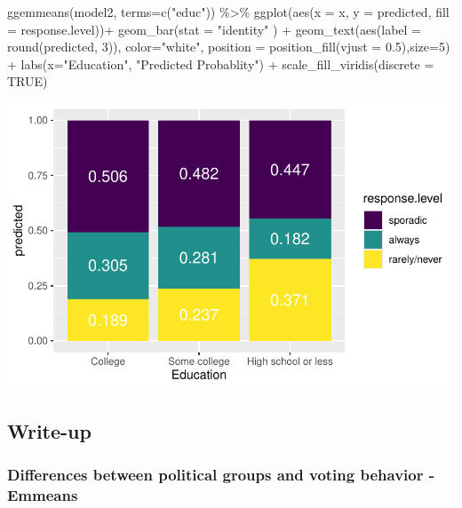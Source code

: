 \documentclass[
  letterpaper,
  DIV=11,
  numbers=noendperiod]{scrartcl}
\newenvironment{Shaded}{\begin{snugshade}}{\end{snugshade}}
\newcommand{\AttributeTok}[1]{\textcolor[rgb]{0.40,0.45,0.13}{#1}}
\newcommand{\ConstantTok}[1]{\textcolor[rgb]{0.56,0.35,0.01}{#1}}
\newcommand{\DecValTok}[1]{\textcolor[rgb]{0.68,0.00,0.00}{#1}}
\newcommand{\FloatTok}[1]{\textcolor[rgb]{0.68,0.00,0.00}{#1}}
\newcommand{\FunctionTok}[1]{\textcolor[rgb]{0.28,0.35,0.67}{#1}}
\newcommand{\NormalTok}[1]{\textcolor[rgb]{0.00,0.23,0.31}{#1}}
\newcommand{\SpecialCharTok}[1]{\textcolor[rgb]{0.37,0.37,0.37}{#1}}
\newcommand{\StringTok}[1]{\textcolor[rgb]{0.13,0.47,0.30}{#1}}
\begin{document}
\begin{Shaded}
\begin{Highlighting}[]
\FunctionTok{ggemmeans}\NormalTok{(model2, }\AttributeTok{terms=}\FunctionTok{c}\NormalTok{(}\StringTok{"educ"}\NormalTok{)) }\SpecialCharTok{\%\textgreater{}\%}
  \FunctionTok{ggplot}\NormalTok{(}\FunctionTok{aes}\NormalTok{(}\AttributeTok{x =}\NormalTok{ x, }\AttributeTok{y =}\NormalTok{ predicted, }\AttributeTok{fill =}\NormalTok{ response.level))}\SpecialCharTok{+}
  \FunctionTok{geom\_bar}\NormalTok{(}\AttributeTok{stat =} \StringTok{"identity"}\NormalTok{ ) }\SpecialCharTok{+} 
   \FunctionTok{geom\_text}\NormalTok{(}\FunctionTok{aes}\NormalTok{(}\AttributeTok{label =} \FunctionTok{round}\NormalTok{(predicted, }\DecValTok{3}\NormalTok{)), }\AttributeTok{color=}\StringTok{"white"}\NormalTok{, }\AttributeTok{position =} \FunctionTok{position\_fill}\NormalTok{(}\AttributeTok{vjust =} \FloatTok{0.5}\NormalTok{),}\AttributeTok{size=}\DecValTok{5}\NormalTok{) }\SpecialCharTok{+} 
  \FunctionTok{labs}\NormalTok{(}\AttributeTok{x=}\StringTok{"Education"}\NormalTok{, }\StringTok{"Predicted Probablity"}\NormalTok{) }\SpecialCharTok{+} 
  \FunctionTok{scale\_fill\_viridis}\NormalTok{(}\AttributeTok{discrete =} \ConstantTok{TRUE}\NormalTok{)}
\end{Highlighting}
\end{Shaded}

\includegraphics{Lab4_multinom_Questions-1_files/figure-pdf/unnamed-chunk-16-1.pdf}

\subsection{Write-up}\label{write-up}

\subsubsection{Differences between political groups and voting behavior
-
Emmeans}\label{differences-between-political-groups-and-voting-behavior---emmeans}
\end{document}
